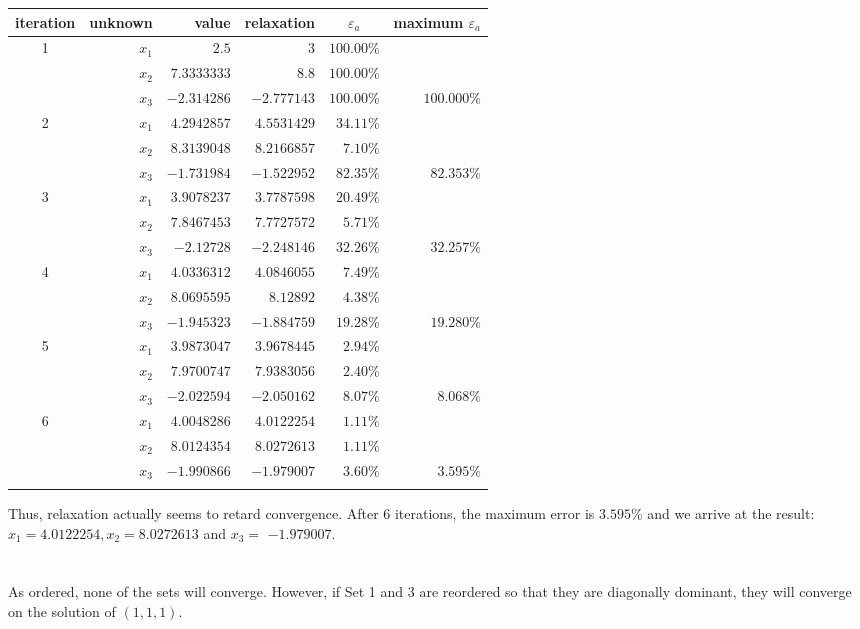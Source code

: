 \documentclass[../main.tex]{subfiles}
\begin{document}
\begin{enumerate}[label=\bfseries(\alph*)]
\begin{tabular}{crrrrr}
\Xhline{1.5pt}
iteration & unknown & value & relaxation &\multicolumn{1}{c}{$\varepsilon_{a}$} & maximum $\varepsilon_{a}$ \\
\hline
1 & $x_{1}$ & $2.5$ & 3 & $100.00 \%$ &  \\
 & $x_{2}$ & $7.3333333$ & $8.8$ & $100.00 \%$ &  \\
 & $x_{3}$ & $-2.314286$ & $-2.777143$ & $100.00 \%$ & $100.000 \%$ \\
\hline
2 & $x_{1}$ & $4.2942857$ & $4.5531429$ & $34.11 \%$ &  \\
 & $x_{2}$ & $8.3139048$ & $8.2166857$ & $7.10 \%$ &  \\
 & $x_{3}$ & $-1.731984$ & $-1.522952$ & $82.35 \%$ & $82.353 \%$ \\
\hline
3 & $x_{1}$ & $3.9078237$ & $3.7787598$ & $20.49 \%$ &  \\
 & $x_{2}$ & $7.8467453$ & $7.7727572$ & $5.71 \%$ &  \\
 & $x_{3}$ & $-2.12728$ & $-2.248146$ & $32.26 \%$ & $32.257 \%$ \\
\hline
4 & $x_{1}$ & $4.0336312$ & $4.0846055$ & $7.49 \%$ &  \\
 & $x_{2}$ & $8.0695595$ & $8.12892$ & $4.38 \%$ &  \\
 & $x_{3}$ & $-1.945323$ & $-1.884759$ & $19.28 \%$ & $19.280 \%$ \\
\hline
5 & $x_{1}$ & $3.9873047$ & $3.9678445$ & $2.94 \%$ &  \\
 & $x_{2}$ & $7.9700747$ & $7.9383056$ & $2.40 \%$ &  \\
 & $x_{3}$ & $-2.022594$ & $-2.050162$ & $8.07 \%$ & $8.068 \%$ \\
\hline
6 & $x_{1}$ & $4.0048286$ & $4.0122254$ & $1.11 \%$ &  \\
 & $x_{2}$ & $8.0124354$ & $8.0272613$ & $1.11 \%$ &  \\
 & $x_{3}$ & $-1.990866$ & $-1.979007$ & $3.60 \%$ & $3.595 \%$ \\
\Xhline{1.5pt}
\end{tabular}
\bigbreak
Thus, relaxation actually seems to retard convergence. After 6 iterations, the maximum error is $3.595 \%$ and we arrive at the result: $x_{1}=4.0122254, x_{2}=8.0272613$ and $x_{3}=$ $-1.979007 .$
\bigbreak


\section{}
As ordered, none of the sets will converge. However, if Set 1 and 3 are reordered so that they are diagonally dominant, they will converge on the solution of $(1,1,1)$.
\bigbreak



\end{enumerate}
\end{document}
